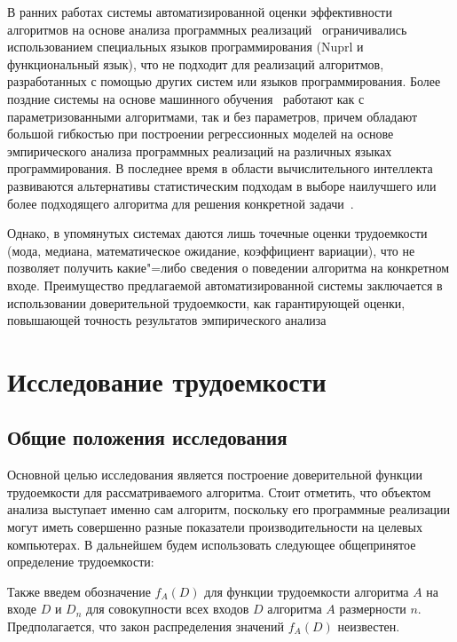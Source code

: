 \documentclass[a4paper, article, 14pt]{extarticle}
\begin{document}
В ранних работах системы автоматизированной оценки эффективности алгоритмов на основе анализа программных реализаций~\cite{functional_nuprl, functional_automation} ограничивались использованием специальных языков программирования (Nuprl и функциональный язык), что не подходит для реализаций алгоритмов, разработанных с помощью других систем или языков программирования. Более поздние системы на основе машинного обучения~\cite{runtime_prediction} работают как с параметризованными алгоритмами, так и без параметров, причем обладают большой гибкостью при построении регрессионных моделей на основе эмпирического анализа программных реализаций на различных языках программирования. В последнее время в области вычислительного интеллекта развиваются альтернативы статистическим подходам в выборе наилучшего или более подходящего алгоритма для решения конкретной задачи~\cite{intelligence_forecasting}.

Однако, в упомянутых системах даются лишь точечные оценки трудоемкости (мода, медиана, математическое ожидание, коэффициент вариации), что не позволяет получить какие"=либо сведения о поведении алгоритма на конкретном входе. Преимущество предлагаемой автоматизированной системы заключается в использовании доверительной трудоемкости, как гарантирующей оценки, повышающей точность результатов эмпирического анализа

\section{Исследование трудоемкости}\label{sec:complexity_research}

\subsection{Общие положения исследования}\label{sec:common_definitions}

Основной целью исследования является построение доверительной функции трудоемкости для рассматриваемого алгоритма. Стоит отметить, что объектом анализа выступает именно сам алгоритм, поскольку его программные реализации могут иметь совершенно разные показатели производительности на целевых компьютерах. В дальнейшем будем использовать следующее общепринятое определение трудоемкости:


Также введем обозначение $f_A(D)$ для функции трудоемкости алгоритма $A$ на входе $D$ и $D_n$ для совокупности всех входов $D$ алгоритма $A$ размерности $n$. Предполагается, что закон распределения значений $f_A(D)$ неизвестен.
\end{document}
